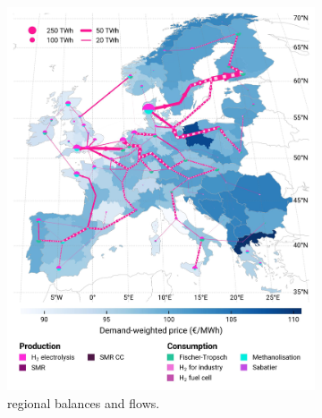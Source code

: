 \documentclass[preprint,12pt,sort&compress]{elsarticle}
\begin{document}
\begin{figure}[htbp]
  \centering
  \begin{subfigure}[t]{0.49\textwidth}
      \vspace{0pt}
      \includegraphics[width=1\textwidth]{maps/pcipmi-national-international-expansion/base_s_adm___2040-balance_map_H2}
      \vspace{-0.5cm}
      \caption{ regional balances and flows.}
      \label{fig:PCI-in_lt_2040_h2}
  \end{subfigure}
  \hfill
  \begin{subfigure}[t]{0.49\textwidth}
      \vspace{0pt}

\end{subfigure}
\end{figure}
\end{document}
